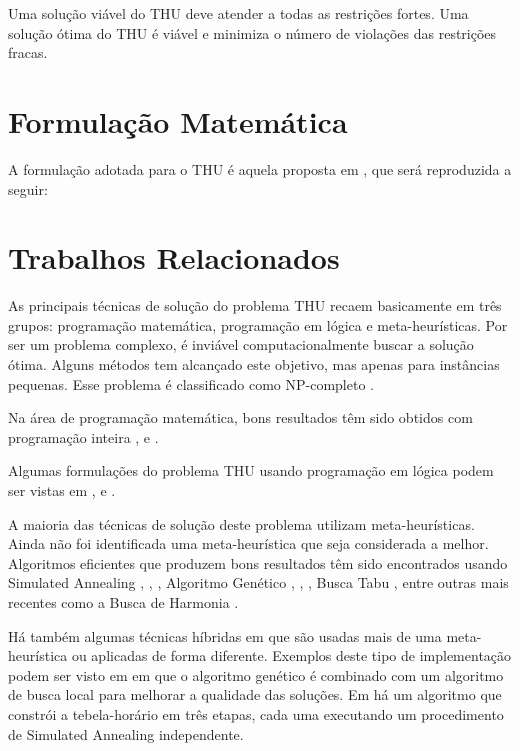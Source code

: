 \documentclass[11pt]{article}
\begin{document}
Uma solução viável do THU deve atender a todas as restrições fortes. Uma solução ótima do THU é viável e minimiza o número de violações das restrições fracas.

\section{Formulação Matemática}
\label{sec:formulacao_matematica}

A formulação adotada para o THU é aquela proposta em \cite{ref}, que será reproduzida a seguir:

\section{Trabalhos Relacionados}
\label{sec:trabalhos_relacionados}

As principais técnicas de solução do problema THU recaem basicamente em três grupos: programação matemática, programação em lógica e meta-heurísticas. Por ser um problema complexo, é inviável computacionalmente buscar a solução ótima. Alguns métodos tem alcançado este objetivo, mas apenas para instâncias pequenas. Esse problema é classificado como NP-completo \cite{Schaerf95asurvey}.

Na área de programação matemática, bons resultados têm sido obtidos com programação inteira \cite{lach_lubbecke}, \cite{broek_hurkens} e \cite{Burke_abranch-andcut}.

Algumas formulações do problema THU usando programação em lógica podem ser vistas em \cite{Gueret95buildinguniversity}, \cite{Goltz99universitytimetabling} e \cite{springerlink:10.1007/s10479-012-1081-x}.

A maioria das técnicas de solução deste problema utilizam meta-heurísticas. Ainda não foi identificada uma meta-heurística que seja considerada a melhor.  Algoritmos eficientes que produzem bons resultados têm sido encontrados usando Simulated Annealing \cite{3-phaseSA}, \cite{sa_hyper_heuristica}, \cite{Elmohamed98acomparison}, Algoritmo Genético \cite{Erben95agenetic}, \cite{suyanto}, \cite{Kanoh:2008:KGA:1460198.1460201}, Busca Tabu \cite{elloumi2008}, entre outras mais recentes como a Busca de Harmonia \cite{albetar_harmony}.

Há também algumas técnicas híbridas em que são usadas mais de uma meta-heurística ou aplicadas de forma diferente. Exemplos deste tipo de implementação podem ser visto em \cite{massoodian2008} em que o algoritmo genético é combinado com um algoritmo de busca local para melhorar a qualidade das soluções. Em \cite{3-phaseSA} há um algoritmo que constrói a tebela-horário em três etapas, cada uma executando um procedimento de Simulated Annealing independente.
\end{document}
